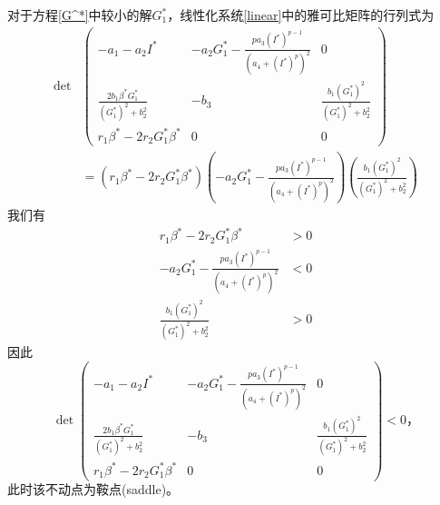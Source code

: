 对于方程\ref{G^*}中较小的解$G_1^*$，线性化系统\ref{linear}中的雅可比矩阵的行列式为
\begin{equation}
    \begin{aligned}
        \det&\begin{pmatrix}
            -a_1-a_2I^*                                & -a_2G_1^*-\frac{pa_3(I^*)^{p-1}}{(a_4+(I^*)^p)^2} & 0                                      \\
            \frac{2b_1\beta^*G_1^*}{(G_1^*)^2 + b_2^2} & -b_3                                              & \frac{b_1(G_1^*)^2}{(G_1^*)^2 + b_2^2} \\
            r_1\beta^*-2r_2G_1^*\beta^*                & 0                                                 & 0
        \end{pmatrix}\\
        &=(r_1\beta^*-2r_2G_1^*\beta^*)(-a_2G_1^*-\frac{pa_3(I^*)^{p-1}}{(a_4+(I^*)^p)^2})( \frac{b_1(G_1^*)^2}{(G_1^*)^2 + b_2^2})
    \end{aligned}
\end{equation}
我们有
\begin{equation}
    \begin{aligned}
        r_1\beta^*-2r_2G_1^*\beta^*                       & >0 \\
        -a_2G_1^*-\frac{pa_3(I^*)^{p-1}}{(a_4+(I^*)^p)^2} & <0 \\
        \frac{b_1(G_1^*)^2}{(G_1^*)^2 + b_2^2}            & >0
    \end{aligned}
\end{equation}
因此\begin{equation}
    \det\begin{pmatrix}
        -a_1-a_2I^*                                & -a_2G_1^*-\frac{pa_3(I^*)^{p-1}}{(a_4+(I^*)^p)^2} & 0                                      \\
        \frac{2b_1\beta^*G_1^*}{(G_1^*)^2 + b_2^2} & -b_3                                              & \frac{b_1(G_1^*)^2}{(G_1^*)^2 + b_2^2} \\
        r_1\beta^*-2r_2G_1^*\beta^*                & 0                                                 & 0
    \end{pmatrix}<0，
\end{equation}
此时该不动点为鞍点(saddle)。

